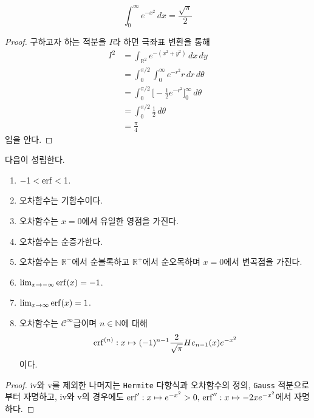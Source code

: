 \begin{proposition}
    \begin{equation*}
        \int_0^\infty e^{-x^2}\,dx=\frac{\sqrt{\pi}}{2}
    \end{equation*}
\end{proposition}

\begin{proof}
    구하고자 하는 적분을 $I$라 하면 극좌표 변환을 통해
    \begin{align*}
        I^2&=\int_{\mathbb{R}^2}e^{-(x^2+y^2)}\,dx\,dy\\
        &=\int_0^{\pi/2}\int_0^\infty e^{-r^2}r\,dr\,d\theta\\
        &=\int_0^{\pi/2}\bigg[-\frac{1}{2}e^{-r^2}\bigg]_0^\infty\,d\theta\\
        &=\int_0^{\pi/2}\frac{1}{2}\,d\theta\\
        &=\frac{\pi}{4}
    \end{align*}
    임을 안다.
\end{proof}

\begin{theorem}
    다음이 성립한다.
    \begin{enumerate}
        \item $-1<\mathrm{erf}<1$.
        \item 오차함수는 기함수이다.
        \item 오차함수는 $x=0$에서 유일한 영점을 가진다.
        \item 오차함수는 순증가한다.
        \item 오차함수는 $\mathbb{R}^-$에서 순볼록하고 $\mathbb{R}^+$에서 순오목하며 $x=0$에서 변곡점을 가진다.
        \item $\lim_{x\to-\infty}\mathrm{erf}(x)=-1$.
        \item $\lim_{x\to\infty}\mathrm{erf}(x)=1$.
        \item 오차함수는 $\mathcal{C}^\infty$급이며 $n\in\mathbb{N}$에 대해
        \begin{equation*}
            \mathrm{erf}^{(n)}:x\mapsto(-1)^{n-1}\frac{2}{\sqrt{\pi}}He_{n-1}(x)e^{-x^2}
        \end{equation*}
        이다.
    \end{enumerate}
\end{theorem}

\begin{proof}
    iv와 v를 제외한 나머지는 \texttt{Hermite} 다항식과 오차함수의 정의, \texttt{Gauss} 적분으로부터 자명하고, iv와 v의 경우에도 $\mathrm{erf}':x\mapsto e^{-x^2}>0,\,\mathrm{erf}'':x\mapsto-2xe^{-x^2}$에서 자명하다.
\end{proof}

